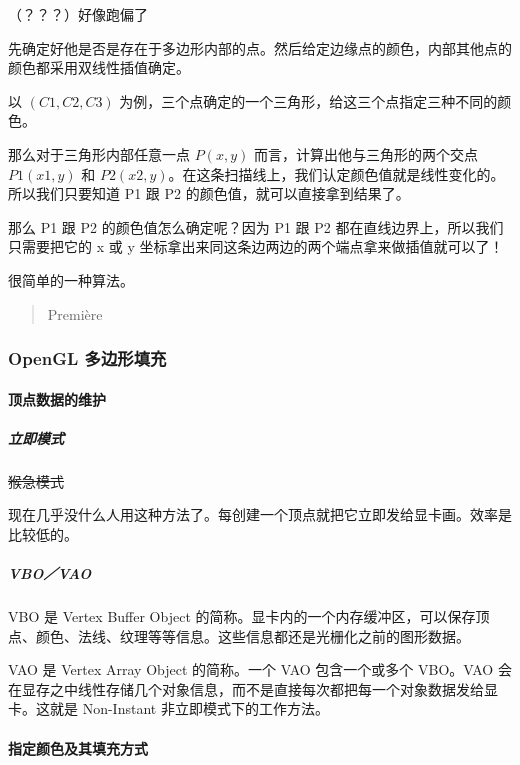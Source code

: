 \documentclass[
]{article}
\begin{document}
（？？？）好像跑偏了

先确定好他是否是存在于多边形内部的点。然后给定边缘点的颜色，内部其他点的颜色都采用双线性插值确定。

以 \((C1, C2, C3)\)
为例，三个点确定的一个三角形，给这三个点指定三种不同的颜色。

那么对于三角形内部任意一点 \(P(x, y)\) 而言，计算出他与三角形的两个交点
\(P1(x1, y)\) 和
\(P2(x2, y)\)。在这条扫描线上，我们认定颜色值就是线性变化的。所以我们只要知道
P1 跟 P2 的颜色值，就可以直接拿到结果了。

那么 P1 跟 P2 的颜色值怎么确定呢？因为 P1 跟 P2
都在直线边界上，所以我们只需要把它的 x 或 y
坐标拿出来同这条边两边的两个端点拿来做插值就可以了！

很简单的一种算法。

\begin{quote}
Première
\end{quote}

\hypertarget{header-n65}{%
\subsubsection{OpenGL 多边形填充}\label{header-n65}}

\hypertarget{header-n66}{%
\paragraph{顶点数据的维护}\label{header-n66}}

\hypertarget{header-n67}{%
\subparagraph{立即模式}\label{header-n67}}

\sout{猴急模式}

现在几乎没什么人用这种方法了。每创建一个顶点就把它立即发给显卡画。效率是比较低的。

\hypertarget{header-n70}{%
\subparagraph{VBO／VAO}\label{header-n70}}

VBO 是 Vertex Buffer Object
的简称。显卡内的一个内存缓冲区，可以保存顶点、颜色、法线、纹理等等信息。这些信息都还是光栅化之前的图形数据。

VAO 是 Vertex Array Object 的简称。一个 VAO 包含一个或多个 VBO。VAO
会在显存之中线性存储几个对象信息，而不是直接每次都把每一个对象数据发给显卡。这就是
Non-Instant 非立即模式下的工作方法。

\hypertarget{header-n73}{%
\paragraph{指定颜色及其填充方式}\label{header-n73}}
\end{document}
